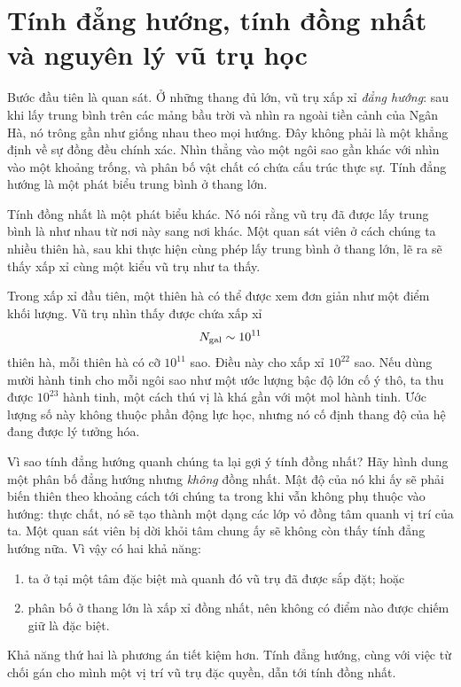 \section{Tính đẳng hướng, tính đồng nhất và nguyên lý vũ trụ học}

Bước đầu tiên là quan sát. Ở những thang đủ lớn, vũ trụ xấp xỉ \emph{đẳng hướng}: sau khi lấy trung bình trên các mảng bầu trời và nhìn ra ngoài tiền cảnh của Ngân Hà, nó trông gần như giống nhau theo mọi hướng. Đây không phải là một khẳng định về sự đồng đều chính xác. Nhìn thẳng vào một ngôi sao gần khác với nhìn vào một khoảng trống, và phân bố vật chất có chứa cấu trúc thực sự. Tính đẳng hướng là một phát biểu trung bình ở thang lớn.

Tính đồng nhất là một phát biểu khác. Nó nói rằng vũ trụ đã được lấy trung bình là như nhau từ nơi này sang nơi khác. Một quan sát viên ở cách chúng ta nhiều thiên hà, sau khi thực hiện cùng phép lấy trung bình ở thang lớn, lẽ ra sẽ thấy xấp xỉ cùng một kiểu vũ trụ như ta thấy.

Trong xấp xỉ đầu tiên, một thiên hà có thể được xem đơn giản như một điểm khối lượng. Vũ trụ nhìn thấy được chứa xấp xỉ
\begin{equation}
N_{\rm gal}\sim 10^{11}
\end{equation}
thiên hà, mỗi thiên hà có cỡ \(10^{11}\) sao. Điều này cho xấp xỉ \(10^{22}\) sao. Nếu dùng mười hành tinh cho mỗi ngôi sao như một ước lượng bậc độ lớn cố ý thô, ta thu được \(10^{23}\) hành tinh, một cách thú vị là khá gần với một mol hành tinh. Ước lượng số này không thuộc phần động lực học, nhưng nó cố định thang độ của hệ đang được lý tưởng hóa.

\begin{classroomqa}
\end{classroomqa}

Vì sao tính đẳng hướng quanh chúng ta lại gợi ý tính đồng nhất? Hãy hình dung một phân bố đẳng hướng nhưng \emph{không} đồng nhất. Mật độ của nó khi ấy sẽ phải biến thiên theo khoảng cách tới chúng ta trong khi vẫn không phụ thuộc vào hướng: thực chất, nó sẽ tạo thành một dạng các lớp vỏ đồng tâm quanh vị trí của ta. Một quan sát viên bị dời khỏi tâm chung ấy sẽ không còn thấy tính đẳng hướng nữa. Vì vậy có hai khả năng:
\begin{enumerate}
\item ta ở tại một tâm đặc biệt mà quanh đó vũ trụ đã được sắp đặt; hoặc
\item phân bố ở thang lớn là xấp xỉ đồng nhất, nên không có điểm nào được chiếm giữ là đặc biệt.
\end{enumerate}
Khả năng thứ hai là phương án tiết kiệm hơn. Tính đẳng hướng, cùng với việc từ chối gán cho mình một vị trí vũ trụ đặc quyền, dẫn tới tính đồng nhất.

